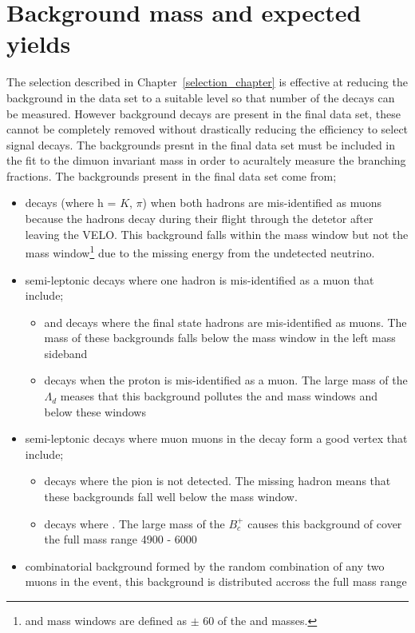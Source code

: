 \section{Background mass \pdfs and expected yields}
\label{sec:backgrounds}
The selection described in Chapter~\ref{selection_chapter} is effective at reducing the background in the data set to a suitable level so that number of the \bmumu decays can be measured. However background decays are present in the final data set, these cannot be completely removed without drastically reducing the efficiency to select signal decays. The backgrounds presnt in the final data set must be included in the fit to the dimuon invariant mass in order to acuraltely measure the \bmumu branching fractions. The backgrounds present in the final data set come from;
\begin{itemize}
\item \bhh decays (where h = $K$, $\pi$) when both hadrons are mis-identified as muons because the hadrons decay during their flight through the detetor after leaving the VELO. This background falls within the \bd mass window but not the \bs mass window\footnote{\bd and \bs mass windows are defined as $\pm$ 60 \mevcc of the \bd and \bs masses.} due to the missing energy from the undetected neutrino. 
\item semi-leptonic decays where one hadron is mis-identified as a muon that include;
\begin{itemize}
\item \bdpimunu and \bsKmunu decays where the final state hadrons are mis-identified as muons. The mass of these backgrounds falls below the \bd mass window in the left mass sideband
\item \lambdab decays when the proton is mis-identified as a muon. The large mass of the $\Lambda_{d}$ meases that this background pollutes the \bs and \bd mass windows and below these windows
\end{itemize}
\item semi-leptonic decays where muon muons in the decay form a good vertex that include;
\begin{itemize}
\item \bpimumu decays where the pion is not detected. The missing hadron means that these backgrounds fall well below the \bd mass window.
\item \bcjpsimunu decays where \jpsimumu. The large mass of the $B^{+}_{c}$ causes this background of cover the full mass range 4900 - 6000 \mevcc
\end{itemize}
\item combinatorial background formed by the random combination of any two muons in the event, this background is distributed accross the full mass range
\end{itemize}

